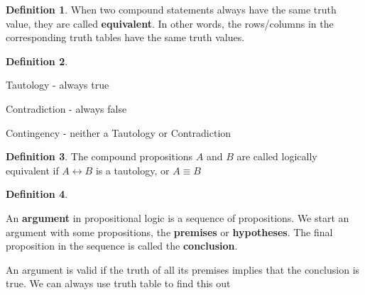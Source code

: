 \documentclass{article}
\theoremstyle{definition}
\newtheorem*{defi}{Definition}
\theoremstyle{definition}
\theoremstyle{named}
\begin{document}
\begin{defi}
    When two compound statements
always have the same truth value, they are called
\textbf{equivalent}. In other words, the rows/columns in the
corresponding truth tables have the same truth
values.
\end{defi}

\begin{defi}
    \begin{citemize}
        \item Tautology - always true
        \item Contradiction - always false
        \item Contingency - neither a Tautology or Contradiction
    \end{citemize}
\end{defi}

\begin{defi}
    The compound propositions $A$ and $B$ are called logically equivalent if $A \leftrightarrow B$ is a tautology, or $A \equiv B$
\end{defi}

\begin{defi}
    \begin{citemize}
        \item An \textbf{argument} in propositional logic is a sequence of
propositions. We start an argument with some
propositions, the \textbf{premises} or \textbf{hypotheses}. The final
proposition in the sequence is called the \textbf{conclusion}.

        \item An argument is valid if the truth of all its premises
implies that the conclusion is true. We can always use truth table to find this out
    \end{citemize}   
\end{defi}

\end{document}

